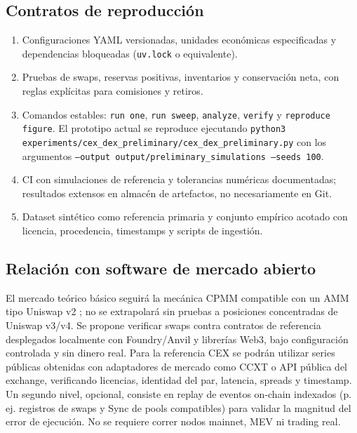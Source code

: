 \subsection{Contratos de reproducción}

\begin{enumerate}
  \item Configuraciones YAML versionadas, unidades económicas especificadas y
    dependencias bloqueadas (\texttt{uv.lock} o equivalente).
  \item Pruebas de swaps, reservas positivas, inventarios y conservación neta, con
    reglas explícitas para comisiones y retiros.
  \item Comandos estables: \texttt{run one}, \texttt{run sweep}, \texttt{analyze},
    \texttt{verify} y \texttt{reproduce figure}. El prototipo actual se reproduce
    ejecutando \texttt{python3 experiments/cex\_dex\_preliminary/cex\_dex\_preliminary.py}
    con los argumentos \texttt{--output output/preliminary\_simulations --seeds 100}.
  \item CI con simulaciones de referencia y tolerancias numéricas documentadas;
    resultados extensos en almacén de artefactos, no necesariamente en Git.
  \item Dataset sintético como referencia primaria y conjunto empírico acotado con
    licencia, procedencia, timestamps y scripts de ingestión.
\end{enumerate}

\subsection{Relación con software de mercado abierto}

El mercado teórico básico seguirá la mecánica CPMM compatible con un AMM tipo
Uniswap v2 \cite{adams2020uniswap,angeris2020cfmm}; no se extrapolará sin pruebas a
posiciones concentradas de Uniswap v3/v4. Se propone verificar swaps contra contratos
de referencia desplegados localmente con Foundry/Anvil y librerías Web3, bajo
configuración controlada y sin dinero real. Para la referencia CEX se podrán utilizar
series públicas obtenidas con adaptadores de mercado como CCXT o API pública del
exchange, verificando licencias, identidad del par, latencia, spreads y timestamp. Un
segundo nivel, opcional, consiste en replay de eventos on-chain indexados (p. ej.
registros de swaps y Sync de pools compatibles) para validar la magnitud del error de
ejecución. No se requiere correr nodos mainnet, MEV ni trading real.
